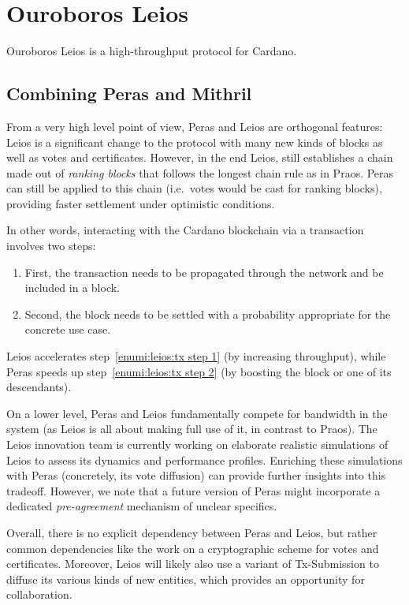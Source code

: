 \section{Ouroboros Leios}

Ouroboros Leios is a high-throughput protocol for Cardano.

\subsection{Combining Peras and Mithril}

From a very high level point of view, Peras and Leios are orthogonal features:
Leios is a significant change to the protocol with many new kinds of blocks as well as votes and certificates.
However, in the end Leios, still establishes a chain made out of \emph{ranking blocks} that follows the longest chain rule as in Praos.
Peras can still be applied to this chain (i.e.\ votes would be cast for ranking blocks), providing faster settlement under optimistic conditions.

In other words, interacting with the Cardano blockchain via a transaction involves two steps:
\begin{enumerate}
\item\label{enumi:leios:tx step 1}
  First, the transaction needs to be propagated through the network and be included in a block.
\item\label{enumi:leios:tx step 2}
  Second, the block needs to be settled with a probability appropriate for the concrete use case.
\end{enumerate}
Leios accelerates step~\ref{enumi:leios:tx step 1} (by increasing throughput), while Peras speeds up step~\ref{enumi:leios:tx step 2} (by boosting the block or one of its descendants).

On a lower level, Peras and Leios fundamentally compete for bandwidth in the system (as Leios is all about making full use of it, in contrast to Praos).
The Leios innovation team is currently working on elaborate realistic simulations of Leios to assess its dynamics and performance profiles.
Enriching these simulations with Peras (concretely, its vote diffusion) can provide further insights into this tradeoff.
However, we note that a future version of Peras might incorporate a dedicated \emph{pre-agreement} mechanism of unclear specifics.

Overall, there is no explicit dependency between Peras and Leios, but rather common dependencies like the work on a cryptographic scheme for votes and certificates.
Moreover, Leios will likely also use a variant of Tx-Submission to diffuse its various kinds of new entities, which provides an opportunity for collaboration.

